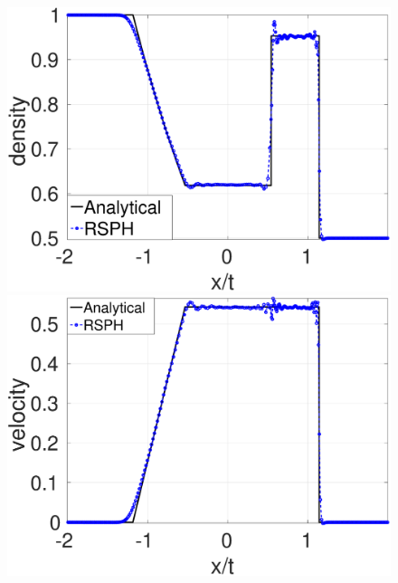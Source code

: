 \begin{figure}
    \centering
    \begin{minipage}{.415\textwidth}
        \centering
        \includegraphics[width=0.99 \textwidth]{./Chapter-4/Figures/GSPH-Sod/GRod-RCM-rho}
    \end{minipage}%
    \begin{minipage}{.415 \textwidth}
        \centering
        \includegraphics[width=0.99 \textwidth]{./Chapter-4/Figures/GSPH-Sod/GRod-RCM-v}
    \end{minipage}%
    \\
    \begin{minipage}{.415\textwidth}
        \centering

\end{minipage}
\end{figure}
